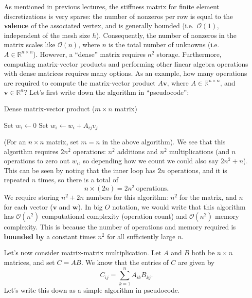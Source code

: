 \documentclass{lecture}
\begin{document}

As mentioned in previous lectures, the stiffness matrix for finite element discretizations is very sparse: the number of nonzeros per row is equal to the \textbf{valence} of the associated vertex, and is generally bounded (i.e.\ $\mathcal{O}(1)$, independent of the mesh size $h$).
Consequently, the number of nonzeros in the matrix scales like $\mathcal{O}(n)$, where $n$ is the total number of unknowns (i.e.\ $A \in \mathbb{R}^{n \times n}$).
However, a ``dense'' matrix requires $n^2$ storage.
Furthermore, computing matrix-vector products and performing other linear algebra operations with dense matrices requires many options.
As an example, how many operations are required to compute the matrix-vector product $A \bm v$, where $A \in \mathbb{R}^{n \times n}$, and $\bm v \in \mathbb{R}^n$?
Let's first write down the algorithm in ``pseudocode'':

\begin{algorithm}[H]
   \caption{Dense matrix-vector product ($m \times n$ matrix)}
   \begin{algorithmic}[1]
         \State Set $w_i \gets 0$
            \State Set $w_i \gets w_i + A_{ij} v_j$
         \EndFor
      \EndFor
   \end{algorithmic}
\end{algorithm}

(For an $n \times n$ matrix, set $m = n$ in the above algorithm).
We see that this algorithm requires $2 n^2$ operations: $n^2$ additions and $n^2$ multiplications (and $n$ operations to zero out $w_i$, so depending how we count we could also say $2n^2 + n$).
This can be seen by noting that the inner loop has $2 n$ operations, and it is repeated $n$ times, so there is a total of
\[
   n \times (2n) = 2n^2 \ \text{operations.}
\]
We require storing $n^2 + 2n$ numbers for this algorithm: $n^2$ for the matrix, and $n$ for each vector ($\bm v$ and $\bm w$).
In big $O$ notation, we would write that this algorithm has $\mathcal{O}(n^2)$ computational complexity (operation count) and $\mathcal{O}(n^2)$ memory complexity.
This is because the number of operations and memory required is \textbf{bounded by} a constant times $n^2$ for all sufficiently large $n$.


Let's now consider matrix-matrix multiplication.
Let $A$ and $B$ both be $n \times n$ matrices, and set $C = A B$.
We know that the entries of $C$ are given by
\[
   C_{ij} = \sum_{k=1}^n A_{ik} B_{kj}.
\]
Let's write this down as a simple algorithm in pseudocode.
\end{document}

